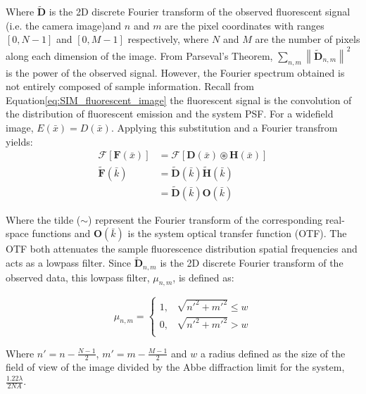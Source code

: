 Where $\tilde{\textbf{D}}$ is the 2D discrete Fourier transform of 
the observed fluorescent signal (i.e. the camera image)and $n$ and 
$m$ are the pixel coordinates with ranges $[0, N-1]$ and $[0, M-1]$ 
respectively, where $N$ and $M$ are the number of pixels along each 
dimension of the image. From Parseval's Theorem, $\sum\limits_{n,m}
\left\| \tilde{\textbf{D}}_{n,m} \right\|^2$ is the power of the 
observed signal. However, the Fourier spectrum obtained is not 
entirely composed of sample information. Recall from 
Equation\ref{eq:SIM_fluorescent_image} the fluorescent signal is the 
convolution of the distribution of fluorescent emission and the system 
PSF. For a widefield image, $E(\bar{x}) = D(\bar{x})$. Applying this
substitution and a Fourier transfrom yields:
\begin{equation}\label{eq:fluor_signal_fourier}
\begin{split}
	\mathcal{F}[\textbf{F}(\bar{x})] &= \mathcal{F}[\textbf{D}(\bar{x}) \circledast \textbf{H}(\bar{x})]\\
	\tilde{\textbf{F}}(\bar{k}) &= \tilde{\textbf{D}}(\bar{k}) \tilde{\textbf{H}}(\bar{k})\\
	&= \tilde{\textbf{D}}(\bar{k}) \textbf{O}(\bar{k})		
\end{split}
\end{equation}

Where the tilde ($\sim$) represent the Fourier transform of the corresponding 
real-space functions and $\textbf{O}(\bar{k})$ is the system optical transfer 
function (OTF).\cite{gustafsson2008three} The OTF both attenuates the sample 
fluorescence distribution spatial frequencies and acts as a lowpass filter. 
Since $\tilde{\textbf{D}}_{n,m}$ is the 2D discrete Fourier transform of 
the observed data, this lowpass filter, $\mu_{n,m}$, is defined as:

\begin{equation}\label{eq:circular_mask}
\mu_{n,m} = 
\begin{cases}
1, & \sqrt{n'^{2} + m'^{2}} \le w\\
0, & \sqrt{n'^{2} + m'^{2}} > w\\ 
\end{cases}
\end{equation}

Where $n' = n - \frac{N-1}{2}$, $m' = m - \frac{M-1}{2}$ and $w$ a radius 
defined as the size of the field of view of the image divided by the Abbe
diffraction limit for the system, $\frac{1.22\lambda}{2NA}$.\cite{abbe1873beitrage} 

